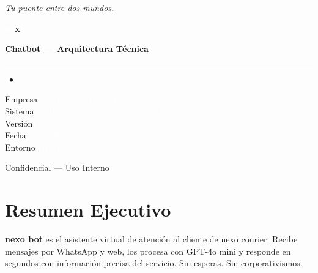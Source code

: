\documentclass[12pt,a4paper]{article}
\begin{document}
\begin{titlepage}
  \pagecolor{nexoBlack}
  \color{white}
  \centering
  \vspace*{3cm}

  {\large\textcolor{nexoSlate}\itshape Tu puente entre dos mundos.\par}
  \vspace{1.2cm}

  {\fontsize{52}{56}\selectfont\bfseries
    \textcolor{white}{ne}\textcolor{nexoCyan}{x}\textcolor{white}{o}\par}
  \vspace{0.4cm}
  {\LARGE\bfseries Chatbot — Arquitectura Técnica\par}

  \vspace{1.8cm}
  \textcolor{nexoCyan}{\rule{0.55\textwidth}{1.5pt}}%
  \textcolor{nexoCyan}{\large\ $\bullet$}\par

  \vspace{1.5cm}
  {\large
    \textcolor{nexoSlate}{Empresa}\quad\textcolor{white}{nexo courier (Costa Rica)} \\[0.5em]
    \textcolor{nexoSlate}{Sistema}\quad\textcolor{white}{Chatbot multicanal de atención al cliente} \\[0.5em]
    \textcolor{nexoSlate}{Versión}\quad\textcolor{white}{1.2} \\[0.5em]
    \textcolor{nexoSlate}{Fecha}\quad\textcolor{white}{Mayo 2026} \\[0.5em]
    \textcolor{nexoSlate}{Entorno}\quad\textcolor{white}{AWS (us-east-1)}
  }

  \vfill
  {\small\textcolor{nexoSlate}{Confidencial — Uso Interno}}
\end{titlepage}

\pagecolor{white}
\color{black}

\tableofcontents
\newpage

\section{Resumen Ejecutivo}

\begin{nexobox}
\textbf{nexo bot} es el asistente virtual de atención al cliente de nexo courier.
Recibe mensajes por WhatsApp y web, los procesa con GPT-4o mini y responde
en segundos con información precisa del servicio. Sin esperas. Sin corporativismos.
\end{nexobox}
\end{document}
